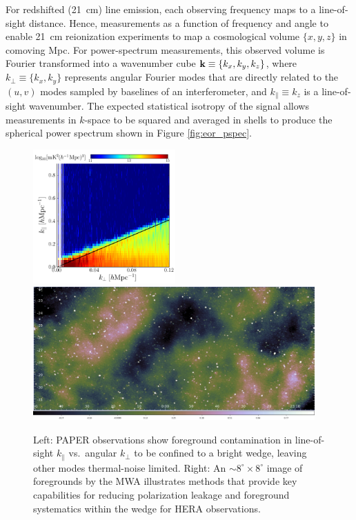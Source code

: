 \documentclass[preprint]{aastex}
\def\kperp{k_{\bot}}
\def\kpar{k_{\|}}
\def\kperp{k_{\bot}}
\def\kpar{k_{\|}}
\def\k{{\bf k}}
\begin{document}
For redshifted (21~cm) line emission, each observing frequency maps to
a line-of-sight distance.  Hence, measurements as a function of frequency and angle 
to enable 21~cm reionization experiments to map a cosmological volume $\{x,y,z\}$ in
comoving Mpc.  For power-spectrum measurements, this observed volume is Fourier transformed into a 
wavenumber cube $\k\equiv\{k_{x}, k_{y}, k_{z}\}$, where 
$\kperp\equiv\{k_{x},k_{y}\}$ represents angular Fourier modes that are directly
related to the $(u,v)$ modes sampled by baselines of an interferometer, and $\kpar\equiv k_{z}$ is
a line-of-sight wavenumber.
The expected statistical isotropy of the signal allows measurements in $k$-space to be
squared and averaged in shells to produce the spherical power spectrum
shown in Figure \ref{fig:eor_pspec}.

\begin{figure}[t] \centering
\includegraphics[height=2.02in]{plots/wedge_tall_wide.png} 
\includegraphics[height=2.02in]{plots/Foregrounds/MWA_EoR0_2min.jpg}
\caption{\small Left:
PAPER observations \citep{pober_et_al2013} show foreground contamination 
in line-of-sight $\kpar$ vs.\ angular $\kperp$ to be
confined to a bright wedge,
leaving other modes thermal-noise limited.
Right:
An $\sim8^{\circ} \times 8^{\circ}$ image of foregrounds by the MWA illustrates
methods that provide key capabilities for reducing
polarization leakage and foreground systematics within the wedge for HERA observations.  
}\label{fig:twoFGViews} \end{figure}
\end{document}
